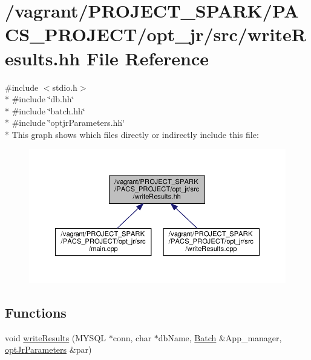 \hypertarget{writeResults_8hh}{\section{/vagrant/\-P\-R\-O\-J\-E\-C\-T\-\_\-\-S\-P\-A\-R\-K/\-P\-A\-C\-S\-\_\-\-P\-R\-O\-J\-E\-C\-T/opt\-\_\-jr/src/write\-Results.hh File Reference}
\label{writeResults_8hh}
}
{\ttfamily \#include $<$stdio.\-h$>$}\\*
{\ttfamily \#include \char`\"{}db.\-hh\char`\"{}}\\*
{\ttfamily \#include \char`\"{}batch.\-hh\char`\"{}}\\*
{\ttfamily \#include \char`\"{}optjr\-Parameters.\-hh\char`\"{}}\\*
This graph shows which files directly or indirectly include this file\-:\nopagebreak
\begin{figure}[H]
\begin{center}
\leavevmode
\includegraphics[width=350pt]{writeResults_8hh__dep__incl}
\end{center}
\end{figure}
\subsection*{Functions}
\begin{DoxyCompactItemize}
\item 
void \hyperlink{writeResults_8hh_a327fdf85cb600d4bb50ff32c2462c699}{write\-Results} (M\-Y\-S\-Q\-L $\ast$conn, char $\ast$db\-Name, \hyperlink{classBatch}{Batch} \&App\-\_\-manager, \hyperlink{classoptJrParameters}{opt\-Jr\-Parameters} \&par)
\end{DoxyCompactItemize}


